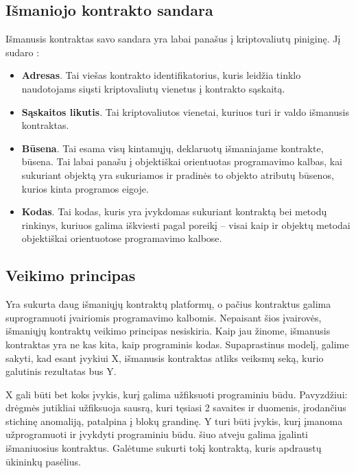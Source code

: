 \documentclass{VUMIFPSkursinis}
\begin{document}
\subsection{Išmaniojo kontrakto sandara}
Išmanusis kontraktas savo sandara yra labai panašus į kriptovaliutų piniginę. Jį sudaro \cite{delmolino2016step}:
\begin{itemize}
    \item \textbf{Adresas}. Tai viešas kontrakto identifikatorius, kuris leidžia tinklo naudotojams siųsti kriptovaliutų vienetus į  kontrakto sąskaitą.
    \item \textbf{Sąskaitos likutis}. Tai kriptovaliutos vienetai, kuriuos turi ir valdo išmanusis kontraktas.
    \item \textbf{Būsena}. Tai esama visų kintamųjų, deklaruotų išmaniajame kontrakte, būsena. Tai labai panašu į objektiškai orientuotas programavimo kalbas, kai sukuriant objektą yra sukuriamos ir pradinės to objekto atributų būsenos, kurios kinta programos eigoje. 
    \item \textbf{Kodas}. Tai kodas, kuris yra įvykdomas sukuriant kontraktą bei metodų rinkinys, kuriuos galima iškviesti pagal poreikį – visai kaip ir objektų metodai objektiškai orientuotose programavimo kalbose.
\end{itemize}

\subsection{Veikimo principas}
Yra sukurta daug išmaniųjų kontraktų platformų, o pačius kontraktus galima suprogramuoti įvairiomis programavimo kalbomis. Nepaisant šios įvairovės, išmaniųjų kontraktų veikimo principas nesiskiria. Kaip jau žinome, išmanusis kontraktas yra ne kas kita, kaip programinis kodas. Supaprastinus modelį, galime sakyti, kad esant įvykiui X, išmanusis kontraktas atliks veiksmų seką, kurio galutinis rezultatas bus Y.

X gali būti bet koks įvykis, kurį galima užfiksuoti programiniu būdu. Pavyzdžiui: drėgmės jutikliai užfiksuoja sausrą, kuri tęsiasi 2 savaites ir duomenis, įrodančius stichinę anomaliją, patalpina į blokų grandinę. Y turi būti įvykis, kurį įmanoma užprogramuoti ir įvykdyti programiniu būdu. šiuo atveju galima įgalinti išmaniuosius kontraktus. Galėtume sukurti tokį kontraktą, kuris apdraustų ūkininkų pasėlius. 
\end{document}
